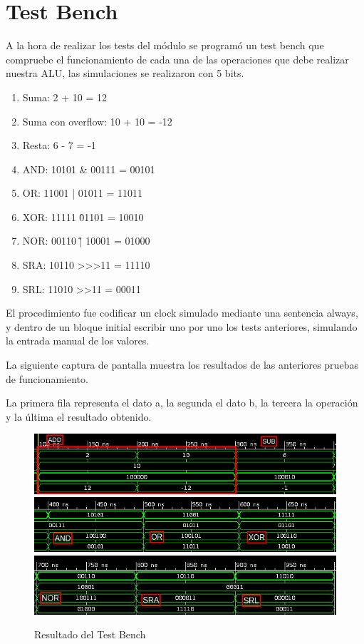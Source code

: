 \documentclass[a4paper]{article}
\begin{document}
\section{Test Bench}

A la hora de realizar los tests del módulo se programó un test bench que compruebe el funcionamiento de cada una de las operaciones que debe realizar nuestra ALU, las simulaciones se realizaron con 5 bits.

\begin{enumerate}
\item Suma: 2 + 10 = 12
\item Suma con overflow: 10 + 10 = -12
\item Resta: 6 - 7 = -1
\item AND: 10101 \& 00111 = 00101
\item OR: 11001 | 01011 = 11011
\item XOR: 11111 \^ 01101 = 10010
\item NOR: 00110 \~| 10001 = 01000
\item SRA: 10110 \textgreater\textgreater\textgreater  11 = 11110
\item SRL: 11010  \textgreater \textgreater 11 = 00011
\end{enumerate}

El procedimiento fue codificar un clock simulado mediante una sentencia always, y dentro de un bloque initial escribir uno por uno los tests anteriores, simulando la entrada manual de los valores.

La siguiente captura de pantalla muestra los resultados de las anteriores pruebas de funcionamiento.

La primera fila representa el dato a, la segunda el dato b, la tercera la operación y la última el resultado obtenido.


\begin{figure}[!htb]
\centering
\includegraphics[width=1\textwidth]{Suma-Resta.png}
\includegraphics[width=1\textwidth]{AND-XOR.png}
\includegraphics[width=1\textwidth]{NOR-SRL.jpg}
\caption{\label{fig:tests}Resultado del Test Bench}
\end{figure}

% 
\end{document}
